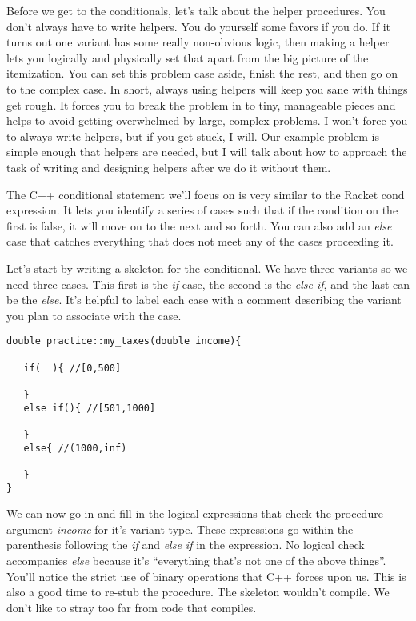 \documentclass[]{tufte-handout}
\begin{document}
Before we get to the conditionals, let's talk about the helper procedures. You don't always have to write helpers. You do yourself some favors if you do. If it turns out one variant has some really non-obvious logic, then making a helper lets you logically and physically set that apart from the big picture of the itemization. You can set this problem case aside, finish the rest, and then go on to the complex case. In short, always using helpers will keep you sane with things get rough. It forces you to break the problem in to tiny, manageable pieces and helps to avoid getting overwhelmed by large, complex problems. I won't force you to always write helpers, but if you get stuck, I will. Our example problem is simple enough that helpers are needed, but I will talk about how to approach the task of writing and designing helpers after we do it without them.

The C++ conditional statement we'll focus on is very similar to the Racket cond expression. It lets you identify a series of cases such that if the condition on the first is false, it will move on to the next and so forth. You can also add an \textit{else} case that catches everything that does not meet any of the cases proceeding it. 

Let's start by writing a skeleton for the conditional. We have three variants so we need three cases. This first is the \textit{if} case, the second is the \textit{else if}, and the last can be the \textit{else}. It's helpful to label each case with a comment describing the variant you plan to associate with the case.

\begin{verbatim}
double practice::my_taxes(double income){

   if(  ){ //[0,500]
   
   }
   else if(){ //[501,1000]
   
   }
   else{ //(1000,inf) 
   
   }
}
\end{verbatim}

We can now go in and fill in the logical expressions that check the procedure argument \textit{income} for it's variant type. These expressions go within the parenthesis following the \textit{if} and \textit{else if} in the expression. No logical check accompanies \textit{else} because it's ``everything that's not one of the above things''. You'll notice the strict use of binary operations that C++ forces upon us. This is also a good time to re-stub the procedure. The skeleton wouldn't compile. We don't like to stray too far from code that compiles.
\end{document}
